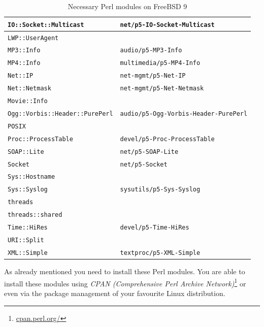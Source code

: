 \documentclass[a4paper,oneside,10pt]{report}
\begin{document}
\begin{table}
\begin{tabular}{|p{15em}|p{18em}|}
		\hline
		\verb|IO::Socket::Multicast| 					& \verb|net/p5-IO-Socket-Multicast| \\
		\hline
		\verb|LWP::UserAgent| 								& \\
		\hline
		\verb|MP3::Info| 											& \verb|audio/p5-MP3-Info| \\
		\hline
		\verb|MP4::Info| 											& \verb|multimedia/p5-MP4-Info| \\
		\hline
		\verb|Net::IP| 												& \verb|net-mgmt/p5-Net-IP| \\
		\hline
		\verb|Net::Netmask| 									& \verb|net-mgmt/p5-Net-Netmask| \\
		\hline
		\verb|Movie::Info| 										& \\
		\hline
		\verb|Ogg::Vorbis::Header::PurePerl|	& \verb|audio/p5-Ogg-Vorbis-Header-PurePerl| \\
		\hline
		\verb|POSIX| 													& \\
		\hline
		\verb|Proc::ProcessTable| 						& \verb|devel/p5-Proc-ProcessTable| \\
		\hline
		\verb|SOAP::Lite| 										& \verb|net/p5-SOAP-Lite| \\
		\hline
		\verb|Socket| 												& \verb|net/p5-Socket| \\
		\hline
		\verb|Sys::Hostname| 									& \\
		\hline
		\verb|Sys::Syslog| 										& \verb|sysutils/p5-Sys-Syslog| \\
		\hline
		\verb|threads| 												& \\
		\hline
		\verb|threads::shared| 								& \\
		\hline
		\verb|Time::HiRes|										& \verb|devel/p5-Time-HiRes| \\
		\hline
		\verb|URI::Split| 										& \\
		\hline
		\verb|XML::Simple| 										& \verb|textproc/p5-XML-Simple| \\
		\hline
	\end{tabular}
	\caption{Necessary Perl modules on FreeBSD 9}
	\label{tab:NecessaryPerlModulesFreeBSD9}
\end{table}

As already mentioned you need to install these Perl modules. You are able to install these modules using {\em CPAN (Comprehensive Perl Archive Network)}\footnote{\url{cpan.perl.org/}} or even via the package management of your favourite Linux distribution.
\end{document}
